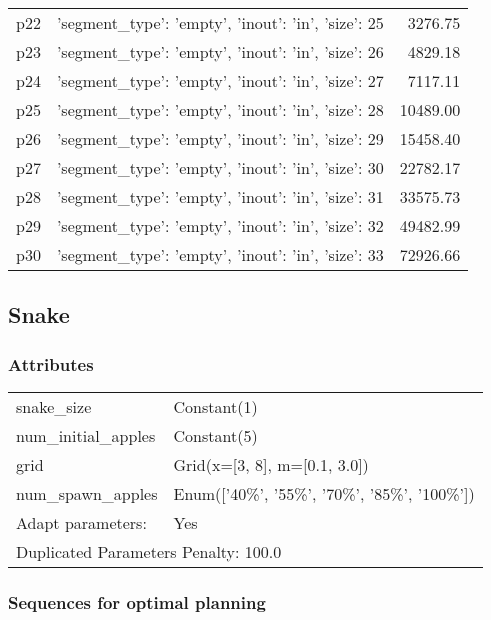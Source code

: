 \documentclass{article}
\begin{document}
\begin{center}
\begin{tabular}{@{}l|r|r@{}}
  p22&{'segment\_type': 'empty', 'inout': 'in', 'size': 25}&3276.75\\
  p23&{'segment\_type': 'empty', 'inout': 'in', 'size': 26}&4829.18\\
  p24&{'segment\_type': 'empty', 'inout': 'in', 'size': 27}&7117.11\\
  p25&{'segment\_type': 'empty', 'inout': 'in', 'size': 28}&10489.00\\
  p26&{'segment\_type': 'empty', 'inout': 'in', 'size': 29}&15458.40\\
  p27&{'segment\_type': 'empty', 'inout': 'in', 'size': 30}&22782.17\\
  p28&{'segment\_type': 'empty', 'inout': 'in', 'size': 31}&33575.73\\
  p29&{'segment\_type': 'empty', 'inout': 'in', 'size': 32}&49482.99\\
  p30&{'segment\_type': 'empty', 'inout': 'in', 'size': 33}&72926.66
                            \end{tabular}
                            \end{center}
                    
                            \newpage \subsection{Snake}
                    \subsubsection*{Attributes}
                    \begin{tabular}{@{}p{}p{}@{}}
                    \toprule
                    snake\_size & Constant(1)\\
num\_initial\_apples & Constant(5)\\
grid & Grid(x=[3, 8], m=[0.1, 3.0])\\
num\_spawn\_apples & Enum(['40\%', '55\%', '70\%', '85\%', '100\%'])
                    \\\midrule
                    Adapt parameters: & Yes \\
                    \bottomrule
                    \multicolumn{2}{l}{Duplicated Parameters Penalty: 100.0}
                    \end{tabular}
                
                            \subsubsection*{Sequences for optimal planning}
\end{document}
